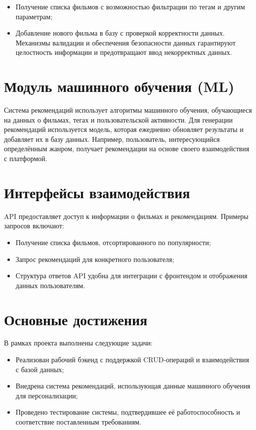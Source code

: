 \begin{itemize}
    \item Получение списка фильмов с возможностью фильтрации по тегам и другим параметрам;
    \item Добавление нового фильма в базу с проверкой корректности данных. Механизмы валидации и обеспечения безопасности данных гарантируют целостность информации и предотвращают ввод некорректных данных.
\end{itemize}

\section{Модуль машинного обучения (ML)}

Система рекомендаций использует алгоритмы машинного обучения, обучающиеся на данных о фильмах, тегах и пользовательской активности. Для генерации рекомендаций используется модель, которая ежедневно обновляет результаты и добавляет их в базу данных. Например, пользователь, интересующийся определённым жанром, получает рекомендации на основе своего взаимодействия с платформой.

\section{Интерфейсы взаимодействия}

API предоставляет доступ к информации о фильмах и рекомендациям. Примеры запросов включают:

\begin{itemize}
    \item Получение списка фильмов, отсортированного по популярности;
    \item Запрос рекомендаций для конкретного пользователя;
    \item Структура ответов API удобна для интеграции с фронтендом и отображения данных пользователям.
\end{itemize}

\section{Основные достижения}

В рамках проекта выполнены следующие задачи:

\begin{itemize}
    \item Реализован рабочий бэкенд с поддержкой CRUD-операций и взаимодействия с базой данных;
    \item Внедрена система рекомендаций, использующая данные машинного обучения для персонализации;
    \item Проведено тестирование системы, подтвердившее её работоспособность и соответствие поставленным требованиям.
\end{itemize}

